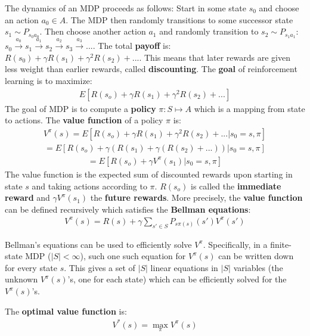 \documentclass{report}
\begin{document}
The dynamics of an MDP proceeds as follows: Start in some state $s_0$ and choose an action $a_0\in A$. The MDP then randomly transitions to some successor state $s_1\sim P_{s_0a_0}$. Then choose another action $a_1$ and randomly transition to $s_2\sim P_{s_1a_1}$: $s_0\xrightarrow{a_0}s_1\xrightarrow{a_1}s_2\xrightarrow{a_2}s_3\xrightarrow{a_3}...$. The total {\bf payoff} is: $R(s_0)+\gamma R(s_1)+\gamma^2R(s_2)+...$. This means that later rewards are given less weight than earlier rewards, called {\bf discounting}. The {\bf goal} of reinforcement learning is to maximize:
\begin{align*}
E[R(s_o)+\gamma R(s_1)+\gamma^2 R(s_2)+...]
\end{align*}
The goal of MDP is to compute a {\bf policy} $\pi:S\mapsto A$ which is a mapping from state to actions. The {\bf value function} of a policy $\pi$ is:
\begin{align*}
V^{\pi}(s) = E[R(s_o)+\gamma R(s_1)+\gamma^2 R(s_2)+...\vert s_0=s,\pi]
\end{align*}
\begin{align*}
= E[R(s_o)+\gamma (R(s_1)+\gamma (R(s_2)+...))\vert s_0=s,\pi]
\end{align*}
\begin{align*}
= E[R(s_o)+\gamma V^{\pi}(s_1)\vert s_0=s,\pi]
\end{align*}
The value function is the expected sum of discounted rewards upon starting in state $s$ and taking actions according to $\pi$.
$R(s_o)$ is called the {\bf immediate reward} and $\gamma V^{\pi}(s_1)$ the {\bf future rewards}.
More precisely, the {\bf value function} can be defined recursively which satisfies the {\bf Bellman equations}:
\begin{align*}
V^{\pi}(s) = R(s)+\gamma \sum_{s'\in S} P_{s\pi(s)}(s')V^{\pi}(s')
\end{align*}

Bellman's equations can be used to efficiently solve $V^{\pi}$. Specifically, in a finite-state MDP ($\vert S\vert < \infty$), such one such equation for $V^{\pi}(s)$ can be written down for every state $s$. This gives a set of $\vert S\vert$ linear equations in $\vert S\vert$ variables (the unknown $V^{\pi}(s)$'s, one for each state) which can be efficiently solved for the $V^{\pi}(s)$'s.

The {\bf optimal value function} is:
\begin{align*}
V^{*}(s) = \max\limits_{\pi} V^{\pi}(s)
\end{align*}
\end{document}
